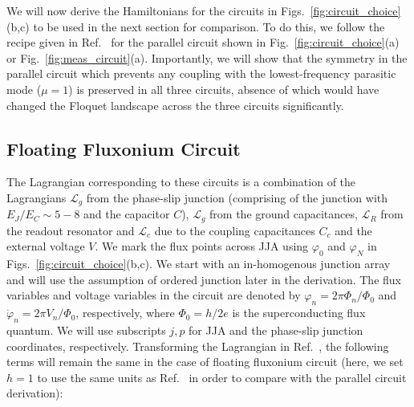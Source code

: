 \documentclass[%
reprint,
superscriptaddress,
 amsmath,amssymb,
 aps,
 prx,
longbibliography,
floatfix,
]{revtex4-2}
\begin{document}
We will now derive the Hamiltonians for the circuits in Figs.~\ref{fig:circuit_choice}(b,c) to be used in the next section for comparison. To do this, we follow the recipe given in Ref.~\cite{viola2015collective} for the parallel circuit shown in Fig.~\ref{fig:circuit_choice}(a) or Fig.~\ref{fig:meas_circuit}(a). Importantly, we will show that the symmetry in the parallel circuit which prevents any coupling with the lowest-frequency parasitic mode ($\mu=1$) is preserved in all three circuits, absence of which would have changed the Floquet landscape across the three circuits significantly. 


\subsection{Floating Fluxonium Circuit}
The Lagrangian corresponding to these circuits is a combination of the Lagrangians $\mathcal{L}_g$ from the phase-slip junction (comprising of the junction with $E_J/E_C\sim 5-8$ and the capacitor $C$), $\mathcal{L}_{g}$ from the ground capacitances, $\mathcal{L}_{R}$ from the readout resonator and $\mathcal{L}_c$ due to the coupling capacitances $C_c$ and the external voltage $V$. We mark the flux points across JJA using $\varphi_0$ and $\varphi_{N}$ in Figs.~\ref{fig:circuit_choice}(b,c). We start with an in-homogenous junction array and will use the assumption of ordered junction later in the derivation. The flux variables and voltage variables in the circuit are denoted by $\varphi_n=2\pi\Phi_n/\Phi_0$ and $\dot{\varphi}_n=2\pi V_n/\Phi_0$, respectively, where $\Phi_0=h/2e$ is the superconducting flux quantum. We will use subscripts $j, p$ for JJA and the phase-slip junction coordinates, respectively. Transforming the Lagrangian in Ref.~\cite{viola2015collective}, the following terms will remain the same in the case of floating fluxonium circuit (here, we set $h=1$ to use the same units as Ref.~\cite{viola2015collective} in order to compare with the parallel circuit derivation):
\end{document}
